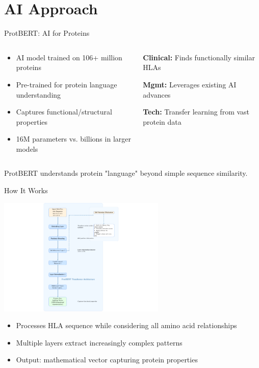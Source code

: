\documentclass[aspectratio=169]{beamer}
\newcommand{\formanagement}[1]{\textcolor{managementcolor}{\textbf{Mgmt:} #1}}
\newcommand{\forclinical}[1]{\textcolor{clinicalcolor}{\textbf{Clinical:} #1}}
\newcommand{\forbioinformatics}[1]{\textcolor{bioinfocolor}{\textbf{Tech:} #1}}
\newcommand{\keytakeaway}[1]{\vspace{0.3cm}\begin{tcolorbox}[colback=yellow!10,colframe=yellow!50!black,title=Key Takeaway]\small #1\end{tcolorbox}}
\begin{document}
\section{AI Approach}

\begin{frame}{ProtBERT: AI for Proteins}
  \begin{columns}
    \begin{column}{0.6\textwidth}
      \begin{itemize}
        \item AI model trained on 106+ million proteins
        \item Pre-trained for protein language understanding
        \item Captures functional/structural properties
        \item 16M parameters vs. billions in larger models
      \end{itemize}
    \end{column}
    \begin{column}{0.4\textwidth}
      \begin{tcolorbox}[colback=gray!5,colframe=gray!40]
      \forclinical{Finds functionally similar HLAs}
      
      \formanagement{Leverages existing AI advances}
      
      \forbioinformatics{Transfer learning from vast protein data}
      \end{tcolorbox}
    \end{column}
  \end{columns}
  
  \keytakeaway{ProtBERT understands protein "language" beyond simple sequence similarity.}
\end{frame}

\begin{frame}{How It Works}
  \begin{center}
    \includegraphics[width=0.60\textwidth]{transformer_diagram.pdf}
  \end{center}

  \begin{itemize}\small
    \item Processes HLA sequence while considering all amino acid relationships
    \item Multiple layers extract increasingly complex patterns
    \item Output: mathematical vector capturing protein properties
  \end{itemize}
\end{frame}
\end{document}
